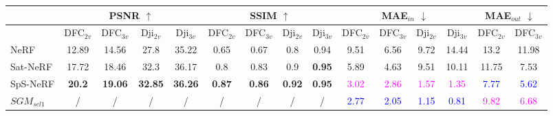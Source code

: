 \documentclass{isprs} %
\newcommand{\Nerf}{{NeRF}}
\newcommand{\OurNeRFShort}{{SpS-NeRF}}
\begin{document}
\begin{table*}[htbp]
\scriptsize
\centering
\begin{tabular}{|l|c|c|c|c||c|c|c|c||c|c|c|c||c|c||}\hline
& \multicolumn{4}{c||}{PSNR $\uparrow$} & \multicolumn{4}{c||}{SSIM $\uparrow$} & \multicolumn{4}{c||}{MAE$_{in}$ $\downarrow$} & \multicolumn{2}{c||}{MAE$_{out}$ $\downarrow$}\\\hline
& DFC$_{2v}$ & DFC$_{3v}$ & Dji$_{2v}$ & Dji$_{3v}$ & DFC$_{2v}$ & DFC$_{3v}$ & Dji$_{2v}$ & Dji$_{3v}$ & DFC$_{2v}$ & DFC$_{3v}$ & Dji$_{2v}$ & Dji$_{3v}$& DFC$_{2v}$ & DFC$_{3v}$ \\\hline\hline
NeRF & 12.89 & 14.56 & 27.8 & 35.22 & 0.65 & 0.67 & 0.8 & 0.94 & 9.51 & 6.56 & 9.72 & 14.44  & 13.2 & 11.98\\\hline
Sat-NeRF & 17.72 & 18.46 & 32.3 & 36.17 & 0.8 & 0.83 & 0.9 & \textbf{0.95} & 5.89 & 4.63 & 9.51 & 10.11  & 11.75 & 7.53\\\hline
\OurNeRFShort & \textbf{20.2} & \textbf{19.06} &\textbf{ 32.85} & \textbf{36.26} & \textbf{0.87} & \textbf{0.86} & \textbf{0.92} & \textbf{0.95}  & \textcolor{magenta}{3.02} & \textcolor{magenta}{2.86} & \textcolor{magenta}{1.57} & \textcolor{magenta}{1.35}  & \textcolor{blue}{7.77} & \textcolor{blue}{5.62} \\\hline
$SGM_{scl1}$ & / & / & / & / & / & / & / & / & \textcolor{blue}{2.77} & \textcolor{blue}{2.05} & \textcolor{blue}{1.15} & \textcolor{blue}{0.81}  & \textcolor{magenta}{9.82} & \textcolor{magenta}{6.68} \\\hline
\end{tabular}
\caption{\textbf{Quantitative metrics}. Best performing metrics in PSNR and SSIM are in bold, while best and second best performing metrics in MAE$_{in}$ and MAE$_{out}$ are in \textcolor{blue}{blue} and \textcolor{magenta}{magenta}. \OurNeRFShort~outperformed \Nerf~and Sat-\Nerf~in all the scenarios. \OurNeRFShort~is less good than SGM$_{scl1}$ in altitude extraction on valid pixels (MAE$_{in}$) which we attribute to the lack of regularization. However, \OurNeRFShort~is better than SGM$_{scl1}$ in occluded and poorly textured areas (MAE$_{out}$). Note that no invalid pixels were identified for the Djibouti dataset.  
}
\label{PSNR_SSIM_MAE}
\end{table*}
\end{document}
